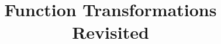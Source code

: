 \documentclass[handout, noauthor, nooutcomes]{ximera}
\author{}
\title{Function Transformations Revisited}
\begin{document}
\begin{abstract}
  
\end{abstract}
\maketitle


%



\end{document}
